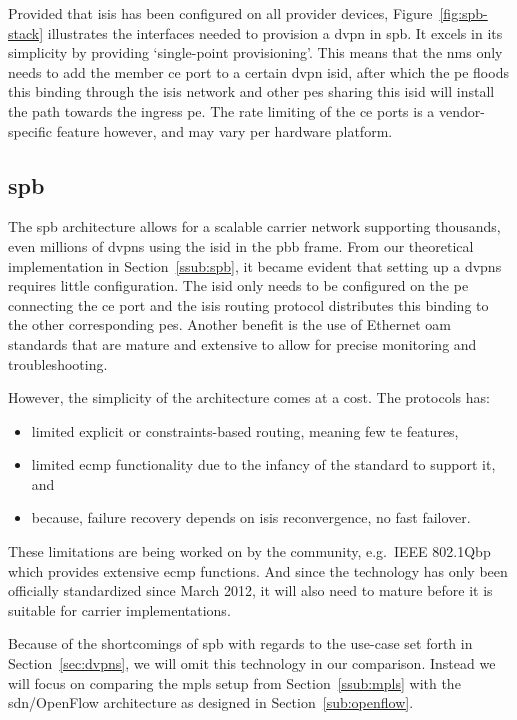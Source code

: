 Provided that \ac{isis} has been configured on all provider devices, Figure~\ref{fig:spb-stack} illustrates the interfaces needed to provision a \ac{dvpn} in \ac{spb}. It excels in its simplicity by providing `single-point provisioning'. This means that the \ac{nms} only needs to add the member \ac{ce} port to a certain \ac{dvpn} \ac{isid}, after which the \ac{pe} floods this binding through the \ac{isis} network and other \acp{pe} sharing this \ac{isid} will install the path towards the ingress \ac{pe}. The rate limiting of the \ac{ce} ports is a vendor-specific feature however, and may vary per hardware platform.


\subsection{\acs{spb}} %
\label{sub:r-spb}

The \ac{spb} architecture allows for a scalable carrier network supporting thousands, even millions of \acp{dvpn} using the \ac{isid} in the \ac{pbb} frame. From our theoretical implementation in Section~\ref{ssub:spb}, it became evident that setting up a \acp{dvpn} requires little configuration. The \ac{isid} only needs to be configured on the \ac{pe} connecting the \ac{ce} port and the \ac{isis} routing protocol distributes this binding to the other corresponding \acp{pe}. Another benefit is the use of Ethernet \ac{oam} standards that are mature and extensive to allow for precise monitoring and troubleshooting.

However, the simplicity of the architecture comes at a cost. The protocols has:
\begin{itemize}
	\item limited explicit or constraints-based routing, meaning few \ac{te} features,
	\item limited \ac{ecmp} functionality due to the infancy of the standard to support it, and
	\item because, failure recovery depends on \ac{isis} reconvergence, no fast failover.
\end{itemize}

These limitations are being worked on by the community, e.g.\ IEEE 802.1Qbp which provides extensive \ac{ecmp} functions. And since the technology has only been officially standardized since March 2012, it will also need to mature before it is suitable for carrier implementations.  

Because of the shortcomings of \ac{spb} with regards to the use-case set forth in Section~\ref{sec:dvpns}, we will omit this technology in our comparison. Instead we will focus on comparing the \ac{mpls} setup from Section~\ref{ssub:mpls} with the \acs{sdn}/OpenFlow architecture as designed in Section~\ref{sub:openflow}.




